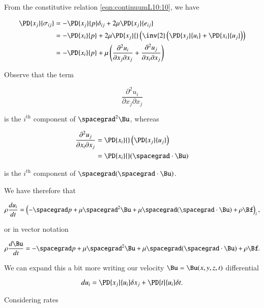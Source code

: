 From the constitutive relation \ref{eqn:continuumL10:10}, we have

\begin{align*}
\PD{x_j}{\sigma_{ij}} 
&= - \PD{x_j}{p} \delta_{ij} + 2 \mu \PD{x_j}{e_{ij}} \\
&= - \PD{x_i}{p} + 2 \mu \PD{x_j}{} \left( 
\inv{2} \left(
 \PD{x_j}{u_i}
+ \PD{x_i}{u_j}
\right)
\right) \\
&= - \PD{x_i}{p} + \mu \left(
\frac{\partial^2 u_i}{\partial x_j \partial x_j}
+\frac{\partial^2 u_j}{\partial x_i \partial x_j}
\right) 
\end{align*}

Observe that the term

\begin{equation}\label{eqn:continuumL10:190}
\frac{\partial^2 u_i}{\partial x_j \partial x_j}
\end{equation}

is the $i^{\text{th}}$ component of $\spacegrad^2 \Bu$, whereas

\begin{align*}
\frac{\partial^2 u_j}{\partial x_i \partial x_j} 
&= \PD{x_i}{} \left( \PD{x_j}{u_j} \right) \\
&= \PD{x_i}{} (\spacegrad \cdot \Bu)
\end{align*}

is the $i^{\text{th}}$ component of $\spacegrad (\spacegrad \cdot \Bu)$.

We have therefore that 

\begin{equation}\label{eqn:continuumL10:210}
\rho \frac{du_i}{dt} = \left( -\spacegrad p + \mu \spacegrad^2 \Bu 
+ \mu \spacegrad (\spacegrad \cdot \Bu) + \rho \Bf
\right)_i,
\end{equation}

or in vector notation

\begin{equation}\label{eqn:continuumL10:230}
\rho \frac{d\Bu}{dt} = -\spacegrad p + \mu \spacegrad^2 \Bu 
+ \mu \spacegrad (\spacegrad \cdot \Bu) + \rho \Bf.
\end{equation}

We can expand this a bit more writing our velocity $\Bu = \Bu(x, y, z, t)$ differential 

\begin{equation}\label{eqn:continuumL10:250}
du_i = \PD{x_j}{u_i} \delta x_j + \PD{t}{u_i} \delta t.
\end{equation}

Considering rates

